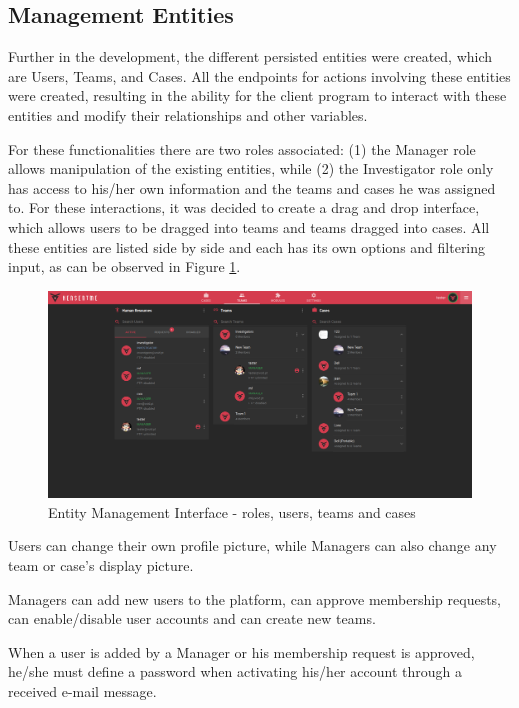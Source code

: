 \subsection{Management Entities}

Further in the development, the different persisted entities were created, which are Users, Teams, and Cases. All the endpoints for actions involving these 
entities were created, resulting in the ability for the client program to interact with these entities and modify their relationships and other variables.

For these functionalities there are two roles associated: (1) the Manager role allows manipulation of the existing entities, while (2) the Investigator role only has access to his/her
own information and the teams and cases he was assigned to. For these interactions, it was decided to create a drag and drop interface, which allows users to be dragged into
teams and teams dragged into cases. All these entities are listed side by side and each has its own options and filtering input, as can be observed in Figure \ref{fig:users}.

\begin{figure}[ht]
 \centering
 \includegraphics[width=1\linewidth]{imgs/users.png}
 \caption{Entity Management Interface - roles, users, teams and cases}
 \label{fig:users}
\end{figure}

Users can change their own profile picture, while Managers can also change any team or case's display picture.

Managers can add new users to the platform, can approve membership requests, can enable/disable user accounts and can create new teams.

When a user is added by a Manager or his membership request is approved, he/she must define a password when activating his/her account through a received e-mail message.


